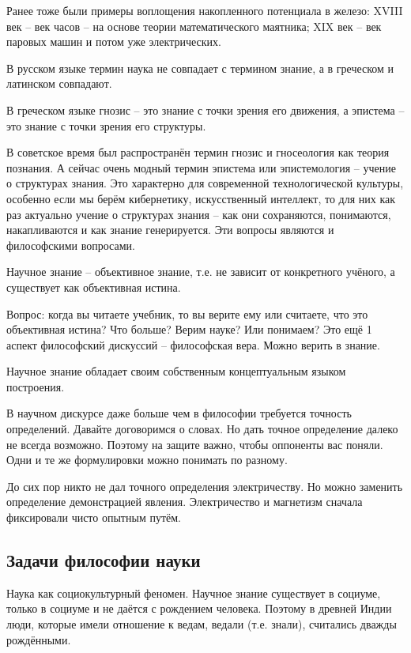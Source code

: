 \documentclass[main.tex]{subfiles}
\begin{document}
Ранее тоже были примеры воплощения накопленного потенциала в железо: XVIII век -- век часов -- на основе теории математического маятника; XIX век -- век паровых машин и потом уже электрических.

В русском языке термин наука не совпадает с термином знание, а в греческом и латинском совпадают.

В греческом языке гнозис -- это знание с точки зрения его движения, а эпистема -- это знание с точки зрения его структуры.

В советское время был распространён термин гнозис и гносеология как теория познания.
А сейчас очень модный термин эпистема или эпистемология -- учение о структурах знания.
Это характерно для современной технологической культуры, особенно если мы берём кибернетику, искусственный интеллект, то для них как раз актуально учение о структурах знания -- как они сохраняются, понимаются, накапливаются и как знание генерируется.
Эти вопросы являются и философскими вопросами.

Научное знание -- объективное знание, т.е. не зависит от конкретного учёного, а существует как объективная истина.

Вопрос: когда вы читаете учебник, то вы верите ему или считаете, что это объективная истина?
Что больше?
Верим науке?
Или понимаем?
Это ещё 1 аспект философский дискуссий -- философская вера.
Можно верить в знание.

Научное знание обладает своим собственным концептуальным языком построения.

В научном дискурсе даже больше чем в философии требуется точность определений.
Давайте договоримся о словах.
Но дать точное определение далеко не всегда возможно.
Поэтому на защите важно, чтобы оппоненты вас поняли.
Одни и те же формулировки можно понимать по разному.

До сих пор никто не дал точного определения электричеству.
Но можно заменить определение демонстрацией явления.
Электричество и магнетизм сначала фиксировали чисто опытным путём.

\subsection{Задачи философии науки}


Наука как социокультурный феномен.
Научное знание существует в социуме, только в социуме и не даётся с рождением человека.
Поэтому в древней Индии люди, которые имели отношение к ведам, ведали (т.е. знали), считались дважды рождёнными.
\end{document}
